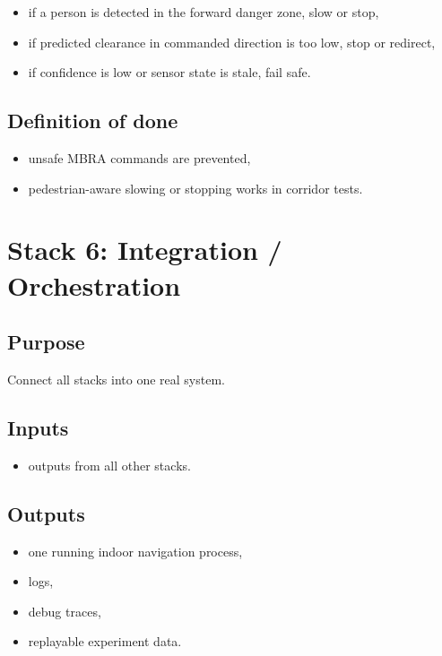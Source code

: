 \documentclass[11pt,a4paper]{article}
\begin{document}
\begin{itemize}[nosep]
  \item if a person is detected in the forward danger zone, slow or stop,
  \item if predicted clearance in commanded direction is too low, stop or redirect,
  \item if confidence is low or sensor state is stale, fail safe.
\end{itemize}

\subsection{Definition of done}

\begin{itemize}[nosep]
  \item unsafe MBRA commands are prevented,
  \item pedestrian-aware slowing or stopping works in corridor tests.
\end{itemize}


\section{Stack 6: Integration / Orchestration}

\subsection{Purpose}

Connect all stacks into one real system.

\subsection{Inputs}

\begin{itemize}[nosep]
  \item outputs from all other stacks.
\end{itemize}

\subsection{Outputs}

\begin{itemize}[nosep]
  \item one running indoor navigation process,
  \item logs,
  \item debug traces,
  \item replayable experiment data.
\end{itemize}
\end{document}
